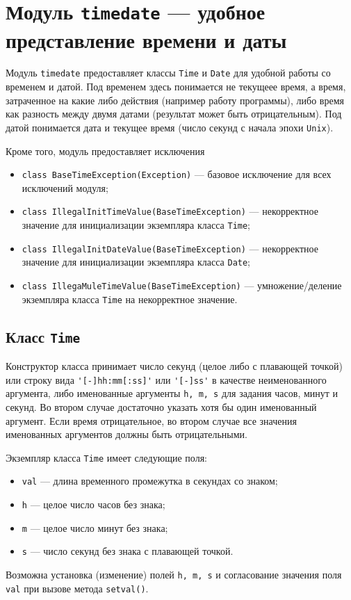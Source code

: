 \section{Модуль {\tt timedate} --- удобное представление времени
  и даты}
Модуль {\tt timedate} предоставляет классы {\tt Time} и {\tt Date} для удобной
работы со временем и датой. Под временем здесь понимается не текущеее время, а
время, затраченное на какие либо действия (например работу программы), либо
время как разность между двумя датами (результат может быть отрицательным).
Под датой понимается дата и текущее время (число секунд с начала эпохи {\tt Unix}).

Кроме того, модуль предоставляет исключения
\begin{itemize}
\item \verb'class BaseTimeException(Exception)' --- базовое исключение для
  всех исключений модуля;
\item \verb'class IllegalInitTimeValue(BaseTimeException)' --- некорректное
  значение для инициализации экземпляра класса {\tt Time};
\item \verb'class IllegalInitDateValue(BaseTimeException)' --- некорректное
  значение для инициализации экземпляра класса {\tt Date};
\item \verb'class IllegaMuleTimeValue(BaseTimeException)' ---
  умножение/деление экземпляра класса {\tt Time} на некорректное
  значение.
\end{itemize}

\subsection{Класс {\tt Time}}
Конструктор класса принимает  число секунд (целое
либо с плавающей точкой) или строку вида \verb|'[-]hh:mm[:ss]'| или \verb|'[-]ss'|  в качестве неименованного аргумента, либо
именованные аргументы {\tt h, m, s} для задания часов, минут и секунд. Во
втором случае достаточно указать хотя бы один именованный аргумент. Если время
отрицательное, во втором случае все значения именованных аргументов должны
быть отрицательными. 

Экземпляр класса {\tt Time} имеет следующие поля:
\begin{itemize}
\item \verb'val' --- длина временного промежутка в секундах со знаком;
\item \verb'h' --- целое число часов без знака;
\item \verb'm' --- целое число минут без знака;
\item \verb's' --- число секунд без знака с плавающей точкой.
\end{itemize}
Возможна установка (изменение) полей {\tt h, m, s} и согласование значения
поля {\tt val} при вызове метода {\tt setval()}.

